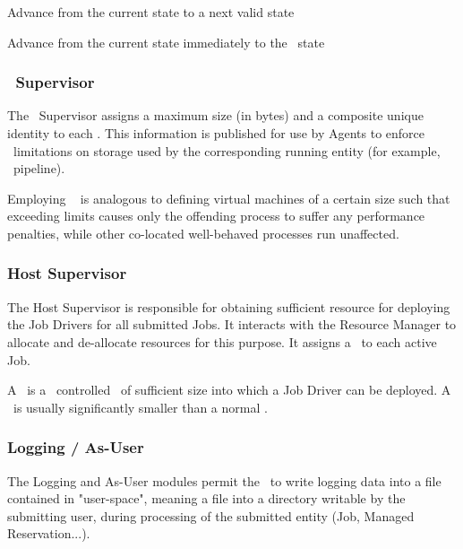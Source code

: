 \begin{itemize}
    \begin{description}
    
    \item Advance from the current state to a next valid state
    \item Advance from the current state immediately to the \varCompleted~state
          
    \end{description} 
    
    \subsubsection{\varLinuxControlGroup~Supervisor}  
    
    The \varLinuxControlGroup~Supervisor assigns a maximum size (in bytes) and a composite
    unique identity to each \varShare. This information is published for use
    by Agents to enforce \varLinuxControlGroup~limitations on storage used by the corresponding
    running entity (for example, \varUIMA~pipeline).
    
    Employing \varLinuxControlGroups~ is analogous to defining virtual machines of a certain
    size such that exceeding limits causes only the offending process to suffer
    any performance penalties, while other co-located well-behaved processes
    run unaffected.
    
    \subsubsection{Host Supervisor}
    
    The Host Supervisor is responsible for obtaining sufficient resource for
    deploying the Job Drivers for all submitted Jobs. It interacts with the
    Resource Manager to allocate and de-allocate resources for this purpose.
    It assigns a \varJdShare~to each active Job.
    
    A \varJdShare~is a \varLinuxControlGroup~controlled \varShare~of sufficient size into which a Job
    Driver can be deployed.  A \varJdShare~is usually significantly smaller than
    a normal \varShare.
    
    \subsubsection{Logging / As-User} 
    
    The Logging and As-User modules permit the \varOrchestrator~to write logging data into
    a file contained in "user-space", meaning a file into a directory writable 
    by the submitting user, during processing of the submitted entity 
    (Job, Managed Reservation...).
    

\end{itemize}
